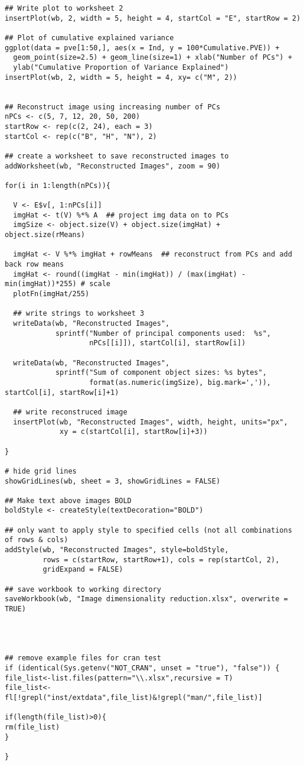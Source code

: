 \documentclass[11pt]{article}\usepackage[]{graphicx}\usepackage[]{color}
\begin{document}
\begin{verbatim}
## Write plot to worksheet 2
insertPlot(wb, 2, width = 5, height = 4, startCol = "E", startRow = 2) 

## Plot of cumulative explained variance
ggplot(data = pve[1:50,], aes(x = Ind, y = 100*Cumulative.PVE)) +
  geom_point(size=2.5) + geom_line(size=1) + xlab("Number of PCs") +
  ylab("Cumulative Proportion of Variance Explained")
insertPlot(wb, 2, width = 5, height = 4, xy= c("M", 2)) 


## Reconstruct image using increasing number of PCs
nPCs <- c(5, 7, 12, 20, 50, 200)
startRow <- rep(c(2, 24), each = 3)
startCol <- rep(c("B", "H", "N"), 2)

## create a worksheet to save reconstructed images to
addWorksheet(wb, "Reconstructed Images", zoom = 90)

for(i in 1:length(nPCs)){
  
  V <- E$v[, 1:nPCs[i]]
  imgHat <- t(V) %*% A  ## project img data on to PCs
  imgSize <- object.size(V) + object.size(imgHat) + object.size(rMeans)
  
  imgHat <- V %*% imgHat + rowMeans  ## reconstruct from PCs and add back row means
  imgHat <- round((imgHat - min(imgHat)) / (max(imgHat) - min(imgHat))*255) # scale
  plotFn(imgHat/255)
  
  ## write strings to worksheet 3
  writeData(wb, "Reconstructed Images", 
            sprintf("Number of principal components used:  %s", 
                    nPCs[[i]]), startCol[i], startRow[i])
  
  writeData(wb, "Reconstructed Images", 
            sprintf("Sum of component object sizes: %s bytes",
                    format(as.numeric(imgSize), big.mark=',')), startCol[i], startRow[i]+1)
  
  ## write reconstruced image
  insertPlot(wb, "Reconstructed Images", width, height, units="px",
             xy = c(startCol[i], startRow[i]+3))
  
}

# hide grid lines
showGridLines(wb, sheet = 3, showGridLines = FALSE)

## Make text above images BOLD
boldStyle <- createStyle(textDecoration="BOLD")

## only want to apply style to specified cells (not all combinations of rows & cols)
addStyle(wb, "Reconstructed Images", style=boldStyle, 
         rows = c(startRow, startRow+1), cols = rep(startCol, 2), 
         gridExpand = FALSE)  

## save workbook to working directory
saveWorkbook(wb, "Image dimensionality reduction.xlsx", overwrite = TRUE) 




## remove example files for cran test
if (identical(Sys.getenv("NOT_CRAN", unset = "true"), "false")) {
file_list<-list.files(pattern="\\.xlsx",recursive = T)
file_list<-fl[!grepl("inst/extdata",file_list)&!grepl("man/",file_list)]

if(length(file_list)>0){
rm(file_list)
}

}
\end{verbatim}
\end{document}
